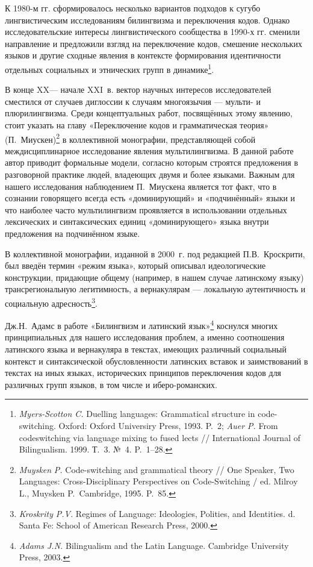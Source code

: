 К 1980-м гг. сформировалось несколько вариантов подходов к сугубо лингвистическим исследованиям билингвизма и переключения кодов. Однако исследовательские интересы лингвистического сообщества в 1990-х гг. сменили направление и предложили взгляд на переключение кодов, смешение нескольких языков и другие сходные явления в контексте формирования идентичности отдельных социальных и этнических групп в динамике\footnote{\emph{Myers-Scotton C. }Duelling languages: Grammatical structure in code-switching. Oxford: Oxford Universiry Press, 1993. P.~2; \emph{Auer P.} From codeswitching via language mixing to fused lects // International Journal of Bilingualism. 1999. Т.~3. №~4. P.~1--28.}.

В конце XX--- начале XXI~в. вектор научных интересов исследователей сместился от случаев диглоссии к случаям многоязычия --- мульти- и плюрилингвизма. Среди концептуальных работ, посвящённых этому явлению, стоит указать на главу «Переключение кодов и грамматическая теория» (П.~Миускен)\footnote{\emph{Muysken}\emph{ P.} Code-switching and grammatical theory // One Speaker, Two Languages: Cross-Disciplinary Perspectives on Code-Switching / ed. Milroy L., Muysken P.~Cambridge, 1995. P.~85.} в коллективной монографии, представляющей собой междисциплинарное исследование явления мультилингвизма. В данной работе автор приводит формальные модели, согласно которым строятся предложения в разговорной практике людей, владеющих двумя и более языками. Важным для нашего исследования наблюдением П.~Миускена является тот факт, что в сознании говорящего всегда есть «доминирующий» и «подчинённый» языки и что наиболее часто мультилингвизм проявляется в использовании отдельных лексических и синтаксических единиц «доминирующего» языка внутри предложения на подчинённом языке.

В коллективной монографии, изданной в 2000~г. под редакцией П.В.~Кроскрити, был введён термин «режим языка», который описывал идеологические конструкции, придающие общему (например, в нашем случае латинскому языку) трансрегиональную легитимность, а вернакулярам --- локальную аутентичность и социальную адресность\footnote{\emph{Kroskrity}\emph{ P.V.} Regimes of Language: Ideologies, Polities, and Identities. d. Santa Fe: School of American Research Press, 2000.}.

Дж.Н.~Адамс в работе «Билингвизм и латинский язык»\footnote{\emph{Adams J.N.} Bilingualism and the Latin Language. Cambridge University Press, 2003.} коснулся многих принципиальных для нашего исследования проблем, а именно соотношения латинского языка и вернакуляра в текстах, имеющих различный социальный контекст и синтаксической обусловленности латинских вставок и заимствований в текстах на иных языках, исторических принципов переключения кодов для различных групп языков, в том числе и иберо-романских.

